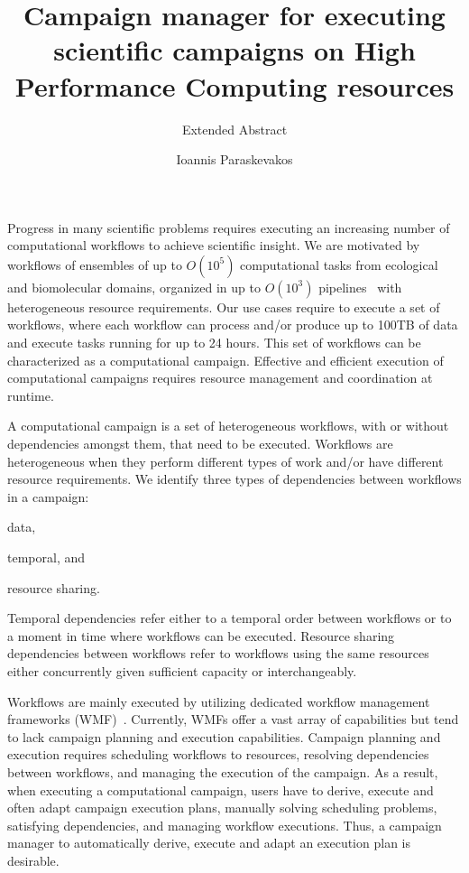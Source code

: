 
\title{Campaign manager for executing scientific campaigns on High Performance 
Computing resources}
\subtitle{Extended Abstract}
\author{Ioannis Paraskevakos}
\vspace{-10ex}
\date{}

\maketitle
\vspace{-7ex}
Progress in many scientific problems requires executing an increasing number of 
computational workflows to achieve scientific insight. We are motivated by 
workflows of ensembles of up to $O(10^5)$ computational tasks from ecological 
and biomolecular domains, organized in up to $O(10^3)$ 
pipelines~\cite{rietmann2012forward, dakka2018high, paraskevakos2019workflow} 
with heterogeneous resource requirements. Our use cases require to execute a set of 
workflows, where each workflow can process and/or 
produce up to 100TB of data and execute tasks running for up to 24 hours. This set 
of workflows can be characterized as a computational campaign. Effective and 
efficient execution of computational campaigns requires resource management 
and coordination at runtime.

A computational campaign is a set of heterogeneous workflows, with or without 
dependencies amongst them, that need to be executed. Workflows are heterogeneous 
when they perform different types of work and/or have different resource 
requirements. We identify three types of dependencies between workflows in a 
campaign:
\begin{inparaenum}[1)]
\item data, 
\item temporal, and 
\item resource sharing.
\end{inparaenum} 
Temporal dependencies refer either to a temporal order between workflows or to 
a moment in time where workflows can be executed. Resource sharing 
dependencies between workflows refer to workflows using the same resources 
either concurrently given sufficient capacity or interchangeably. 

Workflows are mainly executed by utilizing dedicated workflow management 
frameworks (WMF)~\cite{balasubramanian2018harnessing,deelman2015pegasus,ludascher2006scientific,rocklin2015dask,airflow}.
Currently, WMFs offer a vast array of capabilities 
but tend to lack campaign planning and execution capabilities. Campaign planning 
and execution requires scheduling workflows to resources, resolving dependencies 
between workflows, and managing the execution of the campaign. As a result, 
when executing a computational campaign, users have to derive, execute and often 
adapt campaign execution plans, manually solving scheduling problems, satisfying 
dependencies, and managing workflow executions. Thus, a campaign manager to 
automatically derive, execute and adapt an execution plan is desirable.

